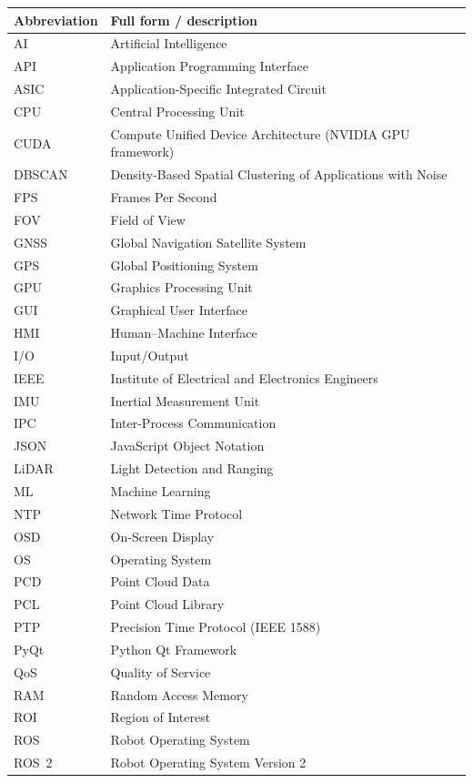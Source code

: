 \documentclass[12pt,a4paper]{report}
\begin{document}
\begin{longtable}{@{}p{}p{}@{}}
\toprule
\textbf{Abbreviation} & \textbf{Full form / description} \\
\midrule
\endhead
AI & Artificial Intelligence \\
API & Application Programming Interface \\
ASIC & Application-Specific Integrated Circuit \\
CPU & Central Processing Unit \\
CUDA & Compute Unified Device Architecture (NVIDIA GPU framework) \\
DBSCAN & Density-Based Spatial Clustering of Applications with Noise \\
FPS & Frames Per Second \\
FOV & Field of View \\
GNSS & Global Navigation Satellite System \\
GPS & Global Positioning System \\
GPU & Graphics Processing Unit \\
GUI & Graphical User Interface \\
HMI & Human--Machine Interface \\
I/O & Input/Output \\
IEEE & Institute of Electrical and Electronics Engineers \\
IMU & Inertial Measurement Unit \\
IPC & Inter-Process Communication \\
JSON & JavaScript Object Notation \\
LiDAR & Light Detection and Ranging \\
ML & Machine Learning \\
NTP & Network Time Protocol \\
OSD & On-Screen Display \\
OS & Operating System \\
PCD & Point Cloud Data \\
PCL & Point Cloud Library \\
PTP & Precision Time Protocol (IEEE 1588) \\
PyQt & Python Qt Framework \\
QoS & Quality of Service \\
RAM & Random Access Memory \\
ROI & Region of Interest \\
ROS & Robot Operating System \\
ROS~2 & Robot Operating System Version 2 \\

\end{longtable}
\end{document}
